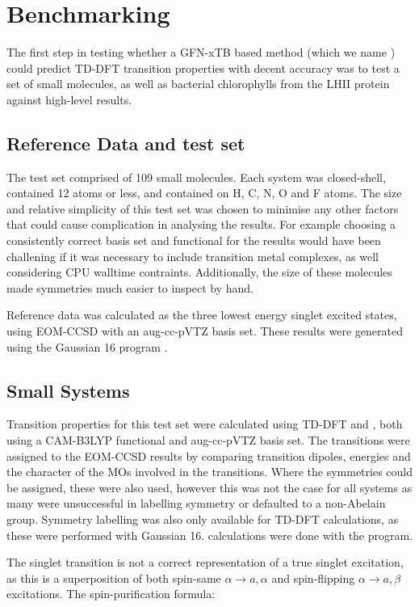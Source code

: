 \section{Benchmarking}
\label{sec:benchmarking}
The first step in testing whether a GFN-xTB based \dscf method (which we
name \dxtb) could predict TD-DFT transition properties with decent accuracy was
to test a set of small molecules, as well as bacterial chlorophylls
from the LHII protein against high-level results.

\subsection{Reference Data and test set}
\label{subsec:reference_data}
The test set comprised of 109 small molecules. Each system was closed-shell, 
contained 12 atoms or less, and contained on H, C, N, O and F atoms. The size and
relative simplicity of this test set was chosen to minimise any other factors that
could cause complication in analysing the results. For example choosing a consistently
correct basis set and functional for the \dscf results would have been challening 
if it was necessary to include transition metal complexes, as well considering
CPU walltime contraints. Additionally, the size of these molecules made symmetries
much easier to inspect by hand.

Reference data was calculated as the three lowest energy singlet excited states, 
using EOM-CCSD with an aug-cc-pVTZ basis set. These results were generated
using the Gaussian 16 program \cite{Gaussian16}.

\subsection{Small Systems}
\label{subsec:smalltest}
Transition properties for this test set were calculated using TD-DFT and \dscf,
both using a CAM-B3LYP functional and aug-cc-pVTZ basis set. The transitions were
assigned to the EOM-CCSD results by comparing transition dipoles, energies and 
the character of the MOs involved in the transitions. Where the symmetries could
be assigned, these were also used, however this was not the case for all systems
as many were unsuccessful in labelling symmetry or defaulted to a non-Abelain group.
Symmetry labelling was also only available for TD-DFT calculations, as these were
performed with Gaussian 16. \dscf calculations were done with the 
program.

The \dscf singlet transition is not a correct representation of a 
true singlet excitation, as this is a superposition of both spin-same
 $\alpha \rightarrow a, \alpha$ and spin-flipping $\alpha \rightarrow a, \beta$
excitations. The spin-purification formula:

